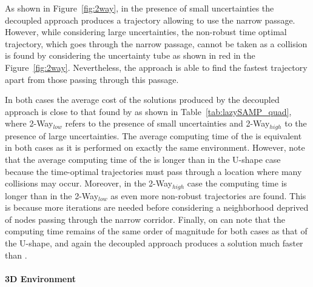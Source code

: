 As shown in Figure~\ref{fig:2way}, in the presence of small uncertainties the decoupled approach produces a trajectory allowing to use the narrow passage. 
However, while considering large uncertainties, the non-robust time optimal trajectory, which goes through the narrow passage, cannot be taken as a collision is found by considering the uncertainty tube as shown in red in the Figure~\ref{fig:2way}.
Nevertheless, the approach is able to find the fastest trajectory apart from those passing through this passage.

In both cases the average cost of the solutions produced by the decoupled approach is close to that found by  as shown in Table~\ref{tab:lazySAMP_quad}, where 2-Way$_{low}$ refers to the presence of small uncertainties and 2-Way$_{high}$ to the presence of large uncertainties.
The average computing time of the  is equivalent in both cases as it is performed on exactly the same environment.
However, note that the average computing time of the  is longer than in the U-shape case because the time-optimal trajectories must pass through a location where many collisions may occur. 
Moreover, in the 2-Way$_{high}$ case the  computing time is longer than in the 2-Way$_{low}$ as even more non-robust trajectories are found.
This is because more iterations are needed before considering a neighborhood deprived of nodes passing through the narrow corridor.
Finally, on can note that the  computing time remains of the same order of magnitude for both cases as that of the U-shape, and again the decoupled approach produces a solution much faster than .

\paragraph{3D Environment} 

